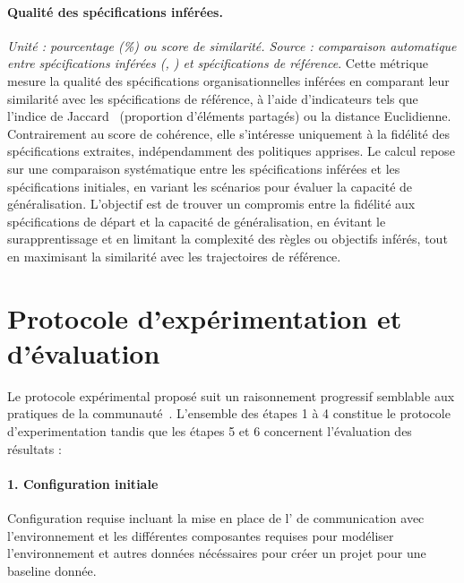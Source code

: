 \paragraph{Qualité des spécifications inférées.}
\textit{Unité : pourcentage (\%) ou score de similarité. Source : comparaison automatique entre spécifications inférées (, ) et spécifications de référence}.
Cette métrique mesure la qualité des spécifications organisationnelles inférées en comparant leur similarité avec les spécifications de référence, à l'aide d'indicateurs tels que l'indice de Jaccard~\cite{Jaccard1908} (proportion d'éléments partagés) ou la distance Euclidienne. Contrairement au score de cohérence, elle s'intéresse uniquement à la fidélité des spécifications extraites, indépendamment des politiques apprises. Le calcul repose sur une comparaison systématique entre les spécifications inférées et les spécifications initiales, en variant les scénarios pour évaluer la capacité de généralisation. L'objectif est de trouver un compromis entre la fidélité aux spécifications de départ et la capacité de généralisation, en évitant le surapprentissage et en limitant la complexité des règles ou objectifs inférés, tout en maximisant la similarité avec les trajectoires de référence.

\section{Protocole d'expérimentation et d'évaluation}\label{sec:protocole_experimental}

Le protocole expérimental proposé suit un raisonnement progressif semblable aux pratiques de la communauté~\cite{papoudakis2021agent}.
L'ensemble des étapes 1 à 4 constitue le protocole d'experimentation tandis que les étapes 5 et 6 concernent l'évaluation des résultats :

\paragraph{1. Configuration initiale}
Configuration requise incluant la mise en place de l'  de communication avec l'environnement et les différentes composantes requises pour modéliser l'environnement et autres données nécéssaires pour créer un projet  pour une baseline donnée.

